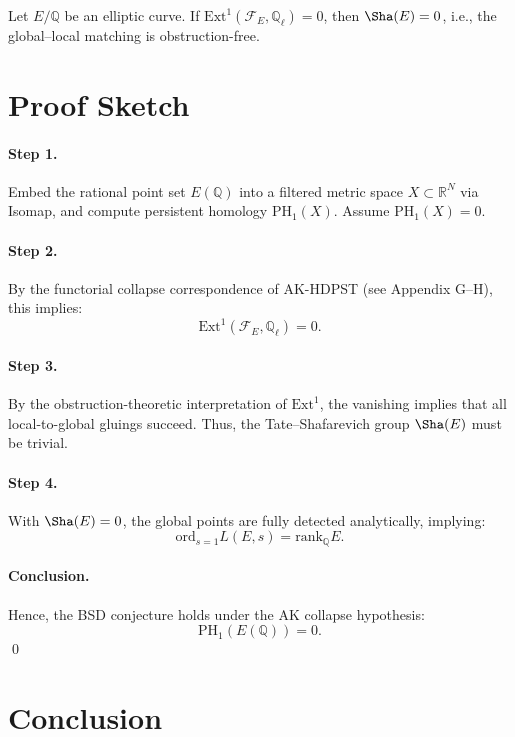 \begin{lemma}
Let \( E/\mathbb{Q} \) be an elliptic curve.  
If \( \mathrm{Ext}^1(\mathcal{F}_E, \mathbb{Q}_\ell) = 0 \), then \( \Sha(E) = 0 \), i.e., the global–local matching is obstruction-free.
\end{lemma}


\section{Proof Sketch}

\paragraph{Step 1.}
Embed the rational point set \( E(\mathbb{Q}) \) into a filtered metric space \( X \subset \mathbb{R}^N \) via Isomap, and compute persistent homology \( \mathrm{PH}_1(X) \).  
Assume \( \mathrm{PH}_1(X) = 0 \).

\paragraph{Step 2.}
By the functorial collapse correspondence of AK-HDPST (see Appendix G–H), this implies:
\[
\mathrm{Ext}^1(\mathcal{F}_E, \mathbb{Q}_\ell) = 0.
\]

\paragraph{Step 3.}
By the obstruction-theoretic interpretation of \( \mathrm{Ext}^1 \), the vanishing implies that all local-to-global gluings succeed.  
Thus, the Tate–Shafarevich group \( \Sha(E) \) must be trivial.

\paragraph{Step 4.}
With \( \Sha(E) = 0 \), the global points are fully detected analytically, implying:
\[
\mathrm{ord}_{s=1}L(E,s) = \mathrm{rank}_\mathbb{Q}E.
\]

\paragraph{Conclusion.}
Hence, the BSD conjecture holds under the AK collapse hypothesis:
\[
\mathrm{PH}_1(E(\mathbb{Q})) = 0.
\]
\qed


\section{Conclusion}

